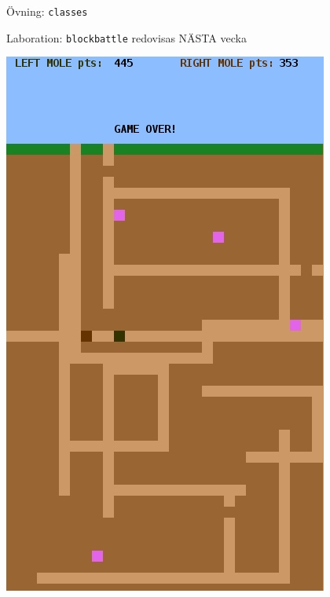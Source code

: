 

\ifkompendium\else

\begin{SlideExtra}{Övning: \texttt{classes}}
\begin{itemize}\SlideFontSmall

\end{itemize}
\end{SlideExtra}

\begin{SlideExtra}{Laboration: \texttt{blockbattle} redovisas NÄSTA vecka}
  \begin{minipage}{0.45\textwidth}
        \includegraphics[height=\textheight]{../img/blockbattle.png}
  \end{minipage}%
  \begin{minipage}{0.55\textwidth}

\end{minipage}
\end{SlideExtra}
